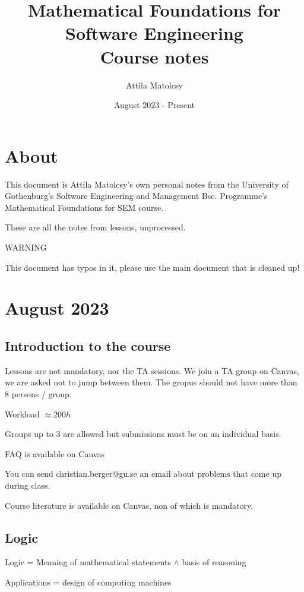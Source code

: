 \documentclass{article}
\title{Mathematical Foundations for Software Engineering \\[1ex] \large Course notes}
\author{Attila Matolcsy}
\date{\nth{25} August 2023 - Present}
\let\stdsection\section
\renewcommand\section{\newpage\stdsection}
\begin{document}
\maketitle

\tableofcontents

\section{About}
This document is Attila Matolcsy's own personal notes from the University of Gothenburg's Software Engineering and Management Bsc. Programme's Mathematical Foundations for SEM course.

These are all the notes from lessons, unprocessed.

\begin{minipage}{\linewidth}
  \Large WARNING \vspace{.25cm}
\end{minipage}
This document has typos in it, please use the main document that is cleaned up!

\section{ August 2023}

\subsection{Introduction to the course}

Lessons are not mandatory, nor the TA sessions.
We join a TA group on Canvas, we are asked not to jump between them. The gropus should not have more than 8 persons / group.

Workload $\approx 200 h$

Groups up to 3 are allowed but submissions must be on an individual basis.

FAQ is available on Canvas

You can send christian.berger@gu.se an email about problems that come up during class.

Course literature is available on Canvas, non of which is mandatory.

\subsection{Logic}

Logic = Meaning of mathematical statements $\wedge$ basis of reasoning

Applications = design of computing machines
\end{document}
